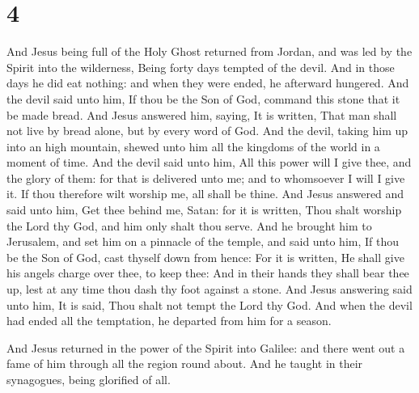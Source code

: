\hypertarget{section-3}{%
\section{4}\label{section-3}}

 And Jesus being full of the Holy Ghost returned from
Jordan, and was led by the Spirit into the wilderness, 
Being forty days tempted of the devil. And in those days he did eat
nothing: and when they were ended, he afterward hungered. 
And the devil said unto him, If thou be the Son of God, command this
stone that it be made bread.  And Jesus answered him,
saying, It is written, That man shall not live by bread alone, but by
every word of God.  And the devil, taking him up into an
high mountain, shewed unto him all the kingdoms of the world in a moment
of time.  And the devil said unto him, All this power will
I give thee, and the glory of them: for that is delivered unto me; and
to whomsoever I will I give it.  If thou therefore wilt
worship me, all shall be thine.  And Jesus answered and
said unto him, Get thee behind me, Satan: for it is written, Thou shalt
worship the Lord thy God, and him only shalt thou serve. 
And he brought him to Jerusalem, and set him on a pinnacle of the
temple, and said unto him, If thou be the Son of God, cast thyself down
from hence:  For it is written, He shall give his angels
charge over thee, to keep thee:  And in their hands they
shall bear thee up, lest at any time thou dash thy foot against a stone.
 And Jesus answering said unto him, It is said, Thou
shalt not tempt the Lord thy God.  And when the devil had
ended all the temptation, he departed from him for a season.

 And Jesus returned in the power of the Spirit into
Galilee: and there went out a fame of him through all the region round
about.  And he taught in their synagogues, being
glorified of all.

